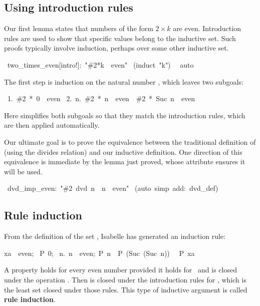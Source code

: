 \subsection{Using introduction rules}

Our first lemma states that numbers of the form $2\times k$ are even.
Introduction rules are used to show that specific values belong to the
inductive set.  Such proofs typically involve 
induction, perhaps over some other inductive set.
\begin{isabelle}
\ two_times_even[intro!]:\ "\#2*k\ \isasymin \ even"
\isanewline
{}\ (induct\ "k")\isanewline
\ \ auto\isanewline
{}
\end{isabelle}
%
The first step is induction on the natural number , which leaves
two subgoals:
\begin{isabelle}
\ 1.\ \#2\ *\ 0\ \isasymin \ even\isanewline
\ 2.\ \isasymAnd n.\ \#2\ *\ n\ \isasymin \ even\ \isasymLongrightarrow \ \#2\ *\ Suc\ n\ \isasymin \ even
\end{isabelle}
%
Here  simplifies both subgoals so that they match the introduction
rules, which are then applied automatically.

Our ultimate goal is to prove the equivalence between the traditional
definition of  (using the divides relation) and our inductive
definition.  One direction of this equivalence is immediate by the lemma
just proved, whose  attribute ensures it will be used.
\begin{isabelle}
\ dvd_imp_even:\ "\#2\ dvd\ n\ \isasymLongrightarrow \ n\ \isasymin \ even"\isanewline
{}\ (auto\ simp\ add:\ dvd_def)\isanewline
{}
\end{isabelle}

\subsection{Rule induction}

From the definition of the set
, Isabelle has
generated an induction rule:
\begin{isabelle}
\isasymlbrakk xa\ \isasymin \ even;\isanewline
\ P\ 0;\isanewline
\ \isasymAnd n.\ \isasymlbrakk n\ \isasymin \ even;\ P\ n\isasymrbrakk \
\isasymLongrightarrow \ P\ (Suc\ (Suc\ n))\isasymrbrakk\isanewline
\ \isasymLongrightarrow \ P\ xa%
\end{isabelle}
A property  holds for every even number provided it
holds for~ and is closed under the operation
.  Then  is closed under the introduction
rules for \isa{even}, which is the least set closed under those rules. 
This type of inductive argument is called \textbf{rule induction}. 

